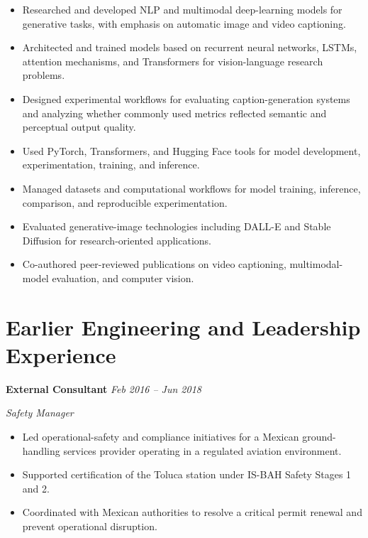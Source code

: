 \documentclass[10pt]{article}
\begin{document}
\begin{itemize}
    \item Researched and developed NLP and multimodal deep-learning models
    for generative tasks, with emphasis on automatic image and video
    captioning.

    \item Architected and trained models based on recurrent neural networks,
    LSTMs, attention mechanisms, and Transformers for vision-language
    research problems.

    \item Designed experimental workflows for evaluating caption-generation
    systems and analyzing whether commonly used metrics reflected semantic
    and perceptual output quality.

    \item Used PyTorch, Transformers, and Hugging Face tools for model
    development, experimentation, training, and inference.

    \item Managed datasets and computational workflows for model training,
    inference, comparison, and reproducible experimentation.

    \item Evaluated generative-image technologies including DALL-E and
    Stable Diffusion for research-oriented applications.

    \item Co-authored peer-reviewed publications on video captioning,
    multimodal-model evaluation, and computer vision.
\end{itemize}


\section*{Earlier Engineering and Leadership Experience}

\textbf{External Consultant}
\hfill
\textit{Feb 2016 -- Jun 2018}

\textit{Safety Manager}

\begin{itemize}
    \item Led operational-safety and compliance initiatives for a Mexican
    ground-handling services provider operating in a regulated aviation
    environment.

    \item Supported certification of the Toluca station under IS-BAH
    Safety Stages 1 and 2.

    \item Coordinated with Mexican authorities to resolve a critical permit
    renewal and prevent operational disruption.
\end{itemize}
\end{document}
